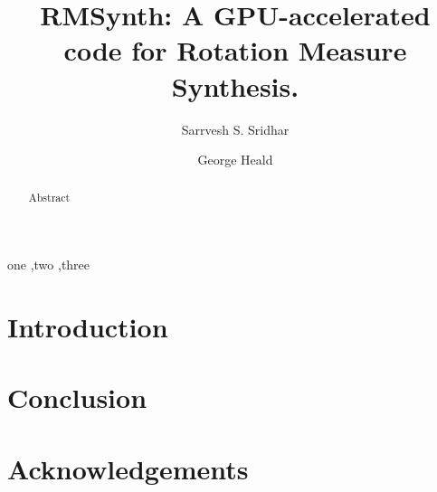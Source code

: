 \documentclass[final,authoryear,3p,times]{elsarticle}
\begin{document}
\begin{frontmatter}

\title{RMSynth: A GPU-accelerated code for Rotation Measure Synthesis.}

\author[kap, ast]{Sarrvesh S. Sridhar}
\author[csi, kap]{George Heald}

\address[kap]{Kapteyn Astronomical Institute, University of Groningen, Postbus 800, 9700AV Groningen, The Netherlands.}
\address[ast]{ASTRON, the Netherlands Institute for Radio Astronomy, Postbus 2, 7990 AA, Dwingeloo, The Netherlands.}
\address[csi]{csiro}

\begin{abstract}
Abstract
\end{abstract}

\begin{keyword}
one \sep  two  \sep three
\end{keyword}

\end{frontmatter}

\section{Introduction}

\section{Conclusion}

\section*{Acknowledgements}



\end{document}
